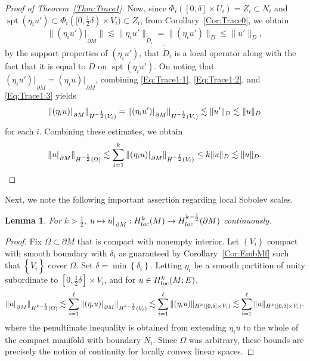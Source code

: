 \documentclass[a4paper,10pt,reqno]{amsart}
\newcommand{\rest}[1]{{{\lvert_{}}_{}}_{#1}}
\newcommand{\dbrac}[1]{\left\{#1\right\}}
\newcommand{\interior}[1]{\mathring{#1}}
\newcommand{\dtilde}[1]{\tilde{\tilde{#1}}}%
\newcommand{\norm}[1]{\| #1 \|}%
\newcommand{\set}[1]{\dbrac{#1}}
\newcommand{\Hard}[2][{}]{{\rm H}^{#2}_{\rm #1}}%
\newcommand{\SobH}[2][{}]{\Hard[#1]{\rm #2}}
\DeclareMathOperator{\spt}{spt}%
\newtheorem{lemma}[theorem]{Lemma}
\theoremstyle{definition}
\begin{document}
\begin{proof}[Proof of Theorem~\ref{Thm:Trace1}]
Now, since $\Phi_i([0,\delta] \times U_i) = Z_i \subset N_i$ and $\spt (\eta_i u') \subset \Phi_i([0, \frac12 \delta) \times V_i) \subset Z_i$, from Corollary~\ref{Cor:Trace0}, we obtain
\begin{equation}
\label{Eq:Trace1:3}
\norm{(\eta_i u')\rest{\partial M}} \lesssim \norm{\eta_i u'}_{\dtilde{D}_i} = \norm{ (\eta_i u')}_{D} \leq \norm{u'}_{D},
\end{equation}
by the support properties of $(\eta_i u')$, that $\dtilde{D}_i$ is a local operator along with the fact that it is equal to $D$ on $\spt (\eta_i u')$.
On noting that $(\eta_i u')\rest{\partial M} = (\eta_i u)\rest{\partial M}$, combining \eqref{Eq:Trace1:1}, \eqref{Eq:Trace1:2}, and \eqref{Eq:Trace1:3}  yields
$$
\norm{(\eta_i u)\rest{\partial M}}_{\SobH{-\frac12}(V_i)} = \norm{ (\eta_i u') \rest{\partial M}}_{\SobH{-\frac12}(V_i)}  \lesssim \norm{u'}_{D} \lesssim \norm{u}_{D}$$
for each $i$.
Combining these estimates, we obtain
\[
\norm{u\rest{\partial M}}_{\SobH{-\frac12}(\Omega)} \lesssim \sum_{i=1}^k \norm{(\eta_i u)\rest{\partial M}}_{\SobH{-\frac12}(V_i)}  \leq k \norm{u}_{D} \lesssim \norm{u}_{D}.
\qedhere
\]
\end{proof}

Next, we note the following important assertion regarding local Sobolev scales.

\begin{lemma}
\label{Lem:RestReg}
For $k > \frac12$,  $u \mapsto u\rest{\partial M}: \SobH[loc]{k}(M) \to \SobH[loc]{k-\frac{1}{2}}(\partial M)$ continuously.
\end{lemma}
\begin{proof}
Fix $\Omega \subset \partial M$ that is compact with nonempty interior.
Let $\set{V_i}$ compact with smooth boundary with $\delta_i$ as guaranteed by Corollary~\ref{Cor:EmbMf} such that $\set{\interior{V}_i}$ cover $\Omega$.
Set $\delta = \min \set{\delta_i}$.
Letting $\eta_i$ be a smooth partition of unity subordinate to $[0,\frac12 \delta] \times V_i$, and for $u \in \SobH[loc]{k}(M;E)$,
\begin{align*}
\norm{u\rest{\partial M}}_{\SobH{k-\frac12}(\Omega)}
\lesssim \sum_{i=1}^\ell \norm{(\eta_i u)\rest{\partial M}}_{\SobH{k - \frac12}(V_i)}
\lesssim \sum_{i=1}^\ell \norm{(\eta_i u)}_{\SobH{k}([0,\delta] \times V_i)}
\lesssim \sum_{i=1}^\ell \norm{u}_{\SobH{k}([0,\delta] \times V_i)}.
\end{align*}
where the penultimate inequality is obtained from extending $\eta_i u$ to the whole of the compact manifold with boundary $N_i$.
Since $\Omega$ was arbitrary, these bounds are precisely the notion of continuity for locally convex linear spaces.
\end{proof}
\end{document}

